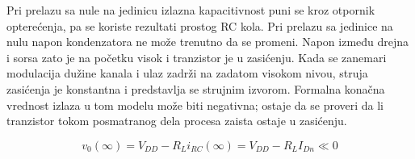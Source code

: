 Pri prelazu sa nule na jedinicu izlazna kapacitivnost puni se kroz otpornik opterećenja, pa se koriste rezultati prostog RC kola. Pri prelazu sa jedinice na nulu napon kondenzatora ne može trenutno da se promeni. Napon između drejna i sorsa zato je na početku visok i tranzistor je u zasićenju. Kada se zanemari modulacija dužine kanala i ulaz zadrži na zadatom visokom nivou, struja zasićenja je konstantna i predstavlja se strujnim izvorom. Formalna konačna vrednost izlaza u tom modelu može biti negativna; ostaje da se proveri da li tranzistor tokom posmatranog dela procesa zaista ostaje u zasićenju.

\[v_0(\infty)=V_{DD}-R_Li_{RC}(\infty)=V_{DD}-R_LI_{Dn}\ll0\]

